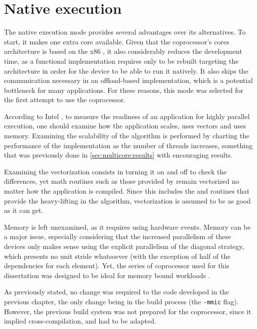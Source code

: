 \documentclass[../thesis]{subfiles}
\begin{document}
	\section{Native execution}
	\label{sec:mic:native}

	The native execution mode provides several advantages over its alternatives. To start, it makes one extra core available. Given that the coprocessor's cores architecture is based on the x86 \isa, it also considerably reduces the development time, as a \cpu functional implementation requires only to be rebuilt targeting the \mic architecture in order for the device to be able to run it natively. It also skips the communication necessary in an offload-based implementation, which is a potential bottleneck for many applications. For these reasons, this mode was selected for the first attempt to use the \intel\xeonphi coprocessor.

	According to Intel \cite{Intel:MIC:Overview}, to measure the readiness of an application for highly parallel execution, one should examine how the application scales, uses vectors and uses memory. Examining the scalability of the algorithm is performed by charting the performance of the implementation as the number of threads increases, something that was previously done in \cref{sec:multicore:results} with encouraging results.

	Examining the vectorization consists in turning it on and off to check the differences, yet math routines such as those provided by \intel\mkl remain vectorized no matter how the application is compiled. Since this includes the \blas and \lapack routines that provide the heavy-lifting in the algorithm, vectorization is assumed to be as good as it can get.

	Memory is left unexamined, as it requires using hardware events. Memory can be a major issue, especially considering that the increased parallelism of these devices only makes sense using the explicit parallelism of the diagonal strategy, which presents no unit stride whatsoever (with the exception of half of the dependencies for each element). Yet, the series of \intel\xeonphi coprocessor used for this dissertation was designed to be ideal for memory bound workloads \cite{Intel:MIC:Discovery}.

	As previously stated, no change was required to the code developed in the previous chapter, the only change being in the build process (the \texttt{-mmic} flag). However, the previous build system was not prepared for the \intel\xeonphi coprocessor, since it implied cross-compilation, and had to be adapted.

	
\end{document}
